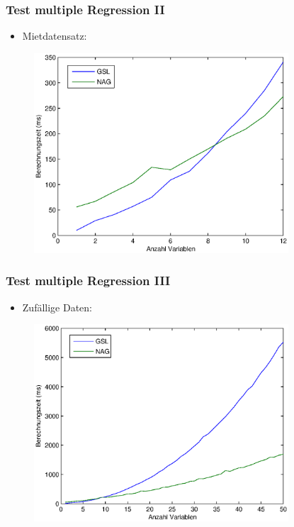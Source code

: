 \documentclass{beamer}
\begin{document}
\begin{frame}
  \frametitle{Test multiple Regression II}
  \begin{itemize}
  \item Mietdatensatz:
  \end{itemize}

  \begin{figure}[t]
    \centering
    \includegraphics[width=9.5cm]{figures/multi_reg_vars_2500_obs.eps}
  \end{figure}
\end{frame}

\begin{frame}
  \frametitle{Test multiple Regression III}
  \begin{itemize}
  \item Zufällige Daten:
  \end{itemize}

  \begin{figure}[t]
    \centering
    \includegraphics[width=9.5cm]{figures/multi_reg_vars_2500_obs_rand.eps}
  \end{figure}

\end{frame}
\end{document}
